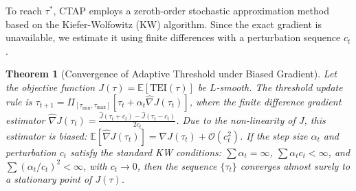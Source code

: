 \documentclass{article}
\newtheorem{theorem}{Theorem}
\begin{document}
To reach $\tau^*$, CTAP employs a zeroth-order stochastic approximation method based on the Kiefer-Wolfowitz (KW) algorithm. Since the exact gradient is unavailable, we estimate it using finite differences with a perturbation sequence $c_t$.

\begin{theorem}[Convergence of Adaptive Threshold under Biased Gradient]
Let the objective function $J(\tau) = \mathbb{E}[\text{TEI}(\tau)]$ be $L$-smooth. The threshold update rule is $\tau_{t+1} = \Pi_{[\tau_{\min}, \tau_{\max}]} \left[ \tau_t + \alpha_t \hat{\nabla} J(\tau_t) \right]$, where the finite difference gradient estimator $\hat{\nabla} J(\tau_t) = \frac{\hat{J}(\tau_t + c_t) - \hat{J}(\tau_t - c_t)}{2c_t}$.
Due to the non-linearity of $J$, this estimator is biased: $\mathbb{E}[\hat{\nabla} J(\tau_t)] = \nabla J(\tau_t) + \mathcal{O}(c_t^2)$.
If the step size $\alpha_t$ and perturbation $c_t$ satisfy the standard KW conditions: $\sum \alpha_t = \infty$, $\sum \alpha_t c_t < \infty$, and $\sum (\alpha_t / c_t)^2 < \infty$, with $c_t \to 0$, then the sequence $\{\tau_t\}$ converges almost surely to a stationary point of $J(\tau)$.
\end{theorem}
\end{document}
